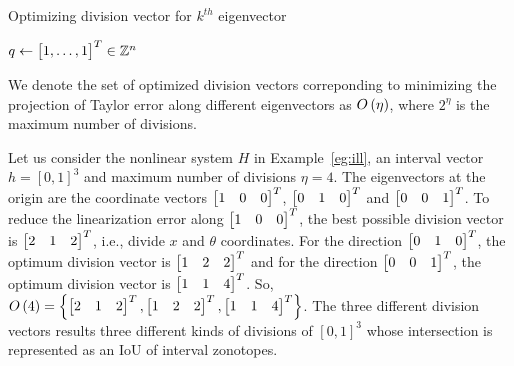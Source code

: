 \begin{algorithm}
\caption{Optimizing division vector for $k^{th}$
eigenvector} $q\gets \begin{bmatrix}1,\ldots,1\end{bmatrix}^T\in\mathbb{Z}^n$\;
\end{algorithm}
%
We denote the set of optimized division vectors correponding to
minimizing the projection of Taylor error along different eigenvectors
as $O\left(\eta\right)$, where $2^\eta$ is the maximum number of divisions.
%
\begin{example}
Let us consider the nonlinear system $H$ in Example~\ref{eg:ill}, an
interval vector $h = [0,1]^3$ and maximum number of divisions $\eta =
4$.  The eigenvectors at the origin are the coordinate vectors
$\begin{bmatrix}1 & 0 & 0\end{bmatrix}^T$, $\begin{bmatrix}0 & 1 & 0\end{bmatrix}^T$ and $\begin{bmatrix}0 &
0 & 1\end{bmatrix}^T$.  To reduce the linearization error along $\begin{bmatrix}1 & 0 &
0\end{bmatrix}^T$, the best possible division vector is $\begin{bmatrix}2 & 1 & 2\end{bmatrix}^T$,
i.e., divide $x$ and $\theta$ coordinates.  For the direction
$\begin{bmatrix}0 & 1 &0\end{bmatrix}^T$, the optimum division vector is $\begin{bmatrix}1 &
2 & 2\end{bmatrix}^T$ and for the direction $\begin{bmatrix}0 & 0 & 1\end{bmatrix}^T$, the optimum
division vector is $\begin{bmatrix}1 & 1 & 4\end{bmatrix}^T$.  So, $O\left(4\right)
= \left\{\begin{bmatrix}2 & 1 & 2\end{bmatrix}^T, \begin{bmatrix}1 & 2 & 2\end{bmatrix}^T, \begin{bmatrix}1 & 1
& 4\end{bmatrix}^T\right\}$.  The three different division vectors results three
different kinds of divisions of $[0,1]^3$ whose intersection is
represented as an IoU of interval zonotopes.
\end{example}
%
